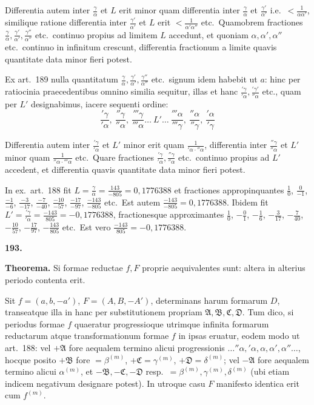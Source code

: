 \documentclass[12pt,a4paper]{article}
\theoremstyle{plain}
\theoremstyle{definition}
\theoremstyle{remark}
\begin{document}
Differentia autem inter $\frac{\gamma}{\alpha}$ et $L$ erit minor quam differentia inter $\frac{\gamma}{\alpha}$ et $\frac{\gamma'}{\alpha'}$ i.e.\ $<\frac{1}{\alpha\alpha'}$, similique ratione differentia inter $\frac{\gamma'}{\alpha'}$ et $L$ erit $<\frac{1}{\alpha'\alpha''}$ etc.\ Quamobrem fractiones $\frac{\gamma}{\alpha},\frac{\gamma'}{\alpha'},\frac{\gamma''}{\alpha''}$ etc.\ continuo propius ad limitem $L$ accedunt, et quoniam $\alpha,\alpha',\alpha''$ etc.\ continuo in infinitum crescunt, differentia fractionum a limite quavis quantitate data minor fieri potest.

Ex art.\ 189 nulla quantitatum $\frac{\gamma}{\alpha},\frac{\gamma'}{\alpha'},\frac{\gamma''}{\alpha''}$ etc.\ signum idem habebit ut $a$: hinc per ratiocinia praecedentibus omnino similia sequitur, illas et hanc $\frac{'\gamma}{'\alpha},\frac{'\gamma'}{''\alpha}$ etc., quam per $L'$ designabimus, iacere sequenti ordine:
\[\frac{'\gamma}{'\alpha},\ \frac{''\gamma}{''\alpha},\ \frac{'''\gamma}{'''\alpha}\ldots\ L'\ldots\ \frac{'''\alpha}{'''\gamma},\ \frac{''\alpha}{''\gamma},\ \frac{'\alpha}{'\gamma}\]

Differentia autem inter $\frac{'\gamma}{'\alpha}$ et $L'$ minor erit quam $\frac{1}{'\alpha\cdot''\alpha}$, differentia inter $\frac{''\gamma}{''\alpha}$ et $L'$ minor quam $\frac{1}{''\alpha\cdot'''\alpha}$ etc.\ Quare fractiones $\frac{'\gamma}{'\alpha},\frac{''\gamma}{''\alpha}$ etc.\ continuo propius ad $L'$ accedent, et differentia quavis quantitate data minor fieri potest.

In ex.\ art.\ 188 fit $L=\frac{\gamma}{\alpha}=\frac{143}{-805}=0{,}1776388$ et fractiones appropinquantes $\frac{1}{0}$, $\frac{0}{-1}$, $\frac{-1}{-6}$, $\frac{-3}{-17}$, $\frac{-7}{-40}$, $\frac{-10}{-57}$, $\frac{-17}{-97}$, $\frac{-143}{-805}$ etc.\ Est autem $\frac{-143}{-805}=0{,}1776388$. Ibidem fit $L'=\frac{'\gamma}{'\alpha}=\frac{-143}{805}=-0{,}1776388$, fractionesque approximantes $\frac{1}{0}$, $-\frac{0}{1}$, $-\frac{1}{6}$, $-\frac{3}{17}$, $-\frac{7}{40}$, $-\frac{10}{57}$, $-\frac{17}{97}$, $-\frac{143}{805}$ etc.\ Est vero $\frac{-143}{805}=-0{,}1776388$.

\textbf{193.}

\textbf{Theorema.} Si formae reductae $f,F$ proprie aequivalentes sunt: altera in alterius periodo contenta erit.

Sit $f=(a,b,-a')$, $F=(A,B,-A')$, determinans harum formarum $D$, transeatque illa in hanc per substitutionem propriam $\mathfrak{A},\mathfrak{B},\mathfrak{C},\mathfrak{D}$. Tum dico, si periodus formae $f$ quaeratur progressioque utrimque infinita formarum reductarum atque transformationum formae $f$ in ipsas eruatur, eodem modo ut art.\ 188: vel $+\mathfrak{A}$ fore aequalem termino alicui progressionis $\ldots''\alpha,'\alpha,\alpha,\alpha',\alpha''\ldots$, hocque posito $+\mathfrak{B}$ fore $=\beta^{(m)}$, $+\mathfrak{C}=\gamma^{(m)}$, $+\mathfrak{D}=\delta^{(m)}$; vel $-\mathfrak{A}$ fore aequalem termino alicui $\alpha^{(m)}$, et $-\mathfrak{B},-\mathfrak{C},-\mathfrak{D}$ resp.\ $=\beta^{(m)},\gamma^{(m)},\delta^{(m)}$ (ubi etiam indicem negativum designare potest). In utroque casu $F$ manifesto identica erit cum $f^{(m)}$.
\end{document}
